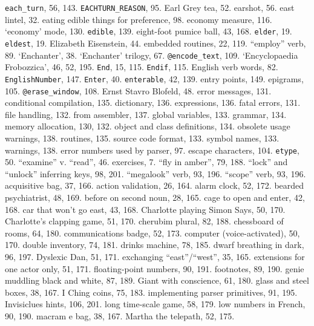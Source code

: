 {{{{{\tt each\_turn}}, 56, 143.
{{\tt EACHTURN\_REASON}}, 95.
Earl Grey tea, 52.
earshot, 56.
east lintel, 32.
eating edible things for preference, 98.
economy measure, 116.
`economy' mode, 130.
{{\tt edible}}, 139.
eight-foot pumice ball, 43, 168.
{{\tt elder}}, 19.
{{\tt eldest}}, 19.
Elizabeth Eisenstein, 44.
embedded routines, 22, 119.
``employ'' verb, 89.
`Enchanter', 38.
`Enchanter' trilogy, 67.
{{\tt @encode\_text}}, 109.
`Encyclopaedia Frobozzica', 46, 52, 195.
{{\tt End}}, 15, 115.
{{\tt Endif}}, 115.
English verb words, 82.
{{\tt EnglishNumber}}, 147.
{{\tt Enter}}, 40.
{{\tt enterable}}, 42, 139.
entry points, 149.
epigrams, 105.
{{\tt @erase\_window}}, 108.
Ernst Stavro Blofeld, 48.
error messages, 131.
\quad  conditional compilation, 135.
\quad  dictionary, 136.
\quad  expressions, 136.
\quad  fatal errors, 131.
\quad  file handling, 132.
\quad  from assembler, 137.
\quad  global variables, 133.
\quad  grammar, 134.
\quad  memory allocation, 130, 132.
\quad  object and class definitions, 134.
\quad  obsolete usage warnings, 138.
\quad  routines, 135.
\quad  source code format, 133.
\quad  symbol names, 133.
\quad  warnings, 138.
error numbers used by parser, 97.
escape characters, 104.
{{\tt etype}}, 50.
``examine'' v. ``read'', 46.
exercises, 7.
\quad  ``fly in amber'', 79, 188.
\quad  ``lock'' and ``unlock'' inferring keys, 98, 201.
\quad  ``megalook'' verb, 93, 196.
\quad  ``scope'' verb, 93, 196.
\quad  acquisitive bag, 37, 166.
\quad  action validation, 26, 164.
\quad  alarm clock, 52, 172.
\quad  bearded psychiatrist, 48, 169.
\quad  before on second noun, 28, 165.
\quad  cage to open and enter, 42, 168.
\quad  car that won't go east, 43, 168.
\quad  Charlotte playing Simon Says, 50, 170.
\quad  Charlotte's clapping game, 51, 170.
\quad  cherubim plural, 82, 188.
\quad  chessboard of rooms, 64, 180.
\quad  communications badge, 52, 173.
\quad  computer (voice-activated), 50, 170.
\quad  double inventory, 74, 181.
\quad  drinks machine, 78, 185.
\quad  dwarf breathing in dark, 96, 197.
\quad  Dyslexic Dan, 51, 171.
\quad  exchanging ``east''/``west'', 35, 165.
\quad  extensions for one actor only, 51, 171.
\quad  floating-point numbers, 90, 191.
\quad  footnotes, 89, 190.
\quad  genie muddling black and white, 87, 189.
\quad  Giant with conscience, 61, 180.
\quad  glass and steel boxes, 38, 167.
\quad  I Ching coins, 75, 183.
\quad  implementing parser primitives, 91, 195.
\quad  Invisiclues hints, 106, 201.
\quad  long time-scale game, 58, 179.
\quad  low numbers in French, 90, 190.
\quad  macram{ e} bag, 38, 167.
\quad  Martha the telepath, 52, 175.
}}}
